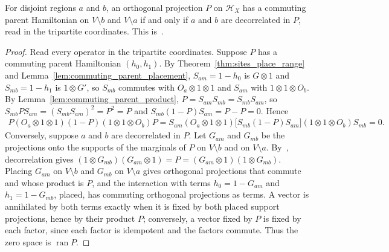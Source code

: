 \begin{theorem}
    \label{thm:commuting_parent_iff_decorrelated}
    \leanok
    For disjoint regions $a$ and $b$, an orthogonal projection $P$ on $\mathcal H_X$ has
    a commuting parent Hamiltonian on $V\setminus b$ and $V\setminus a$ if and only if
    $a$ and $b$ are decorrelated in $P$, read in the tripartite coordinates.
    This is~\cite[Proposition~D.3, lines 2221--2289]{Cirac2016MPDO_arXiv}.
\end{theorem}
\begin{proof}\leanok
    Read every operator in the tripartite coordinates. Suppose $P$ has a commuting
    parent Hamiltonian $(h_0,h_1)$. By Theorem~\ref{thm:sites_place_range} and
    Lemma~\ref{lem:commuting_parent_placement}, $S_{am}=1-h_0$ is $G\otimes1$ and
    $S_{mb}=1-h_1$ is $1\otimes G'$, so $S_{mb}$ commutes with $O_a\otimes1\otimes1$ and
    $S_{am}$ with $1\otimes1\otimes O_b$. By Lemma~\ref{lem:commuting_parent_product},
    $P=S_{am}S_{mb}=S_{mb}S_{am}$, so $S_{mb}PS_{am}=(S_{mb}S_{am})^2=P^2=P$ and
    $S_{mb}(1-P)S_{am}=P-P=0$. Hence
    \begin{align*}
        P(O_a\otimes1\otimes1)(1-P)(1\otimes1\otimes O_b)P
        =S_{am}(O_a\otimes1\otimes1)\bigl[S_{mb}(1-P)S_{am}\bigr]
        (1\otimes1\otimes O_b)S_{mb}=0.
    \end{align*}
    Conversely, suppose $a$ and $b$ are decorrelated in $P$. Let $G_{am}$ and $G_{mb}$ be
    the projections onto the supports of the marginals of $P$ on $V\setminus b$ and on
    $V\setminus a$. By~\cite[lines 2225--2277]{Cirac2016MPDO_arXiv}, decorrelation gives
    $(1\otimes G_{mb})(G_{am}\otimes1)=P=(G_{am}\otimes1)(1\otimes G_{mb})$. Placing
    $G_{am}$ on $V\setminus b$ and $G_{mb}$ on $V\setminus a$ gives orthogonal
    projections that commute and whose product is $P$, and the interaction with terms
    $h_0=1-G_{am}$ and $h_1=1-G_{mb}$, placed, has commuting orthogonal projections as
    terms. A vector is annihilated by both terms exactly when it is fixed by both placed
    support projections, hence by their product $P$; conversely, a vector fixed by $P$
    is fixed by each factor, since each factor is idempotent and the factors commute.
    Thus the zero space is $\operatorname{ran}P$.
\end{proof}
